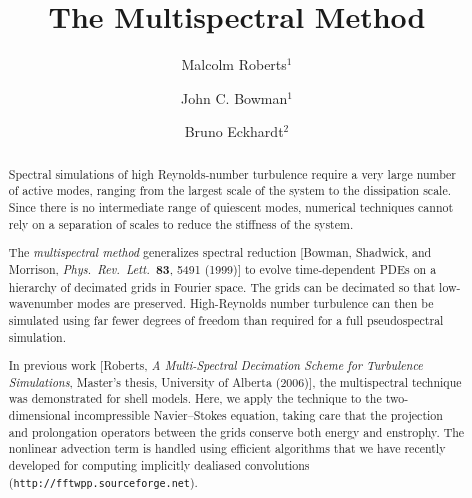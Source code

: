 \documentclass{amsart}
\title{The Multispectral Method}
\author{Malcolm Roberts$^1$
\and
John C. Bowman$^1$
\and
Bruno Eckhardt$^2$
}
\date{}
\begin{document}
\begin{abstract}

Spectral simulations of high Reynolds-number turbulence require a very
large number of active modes, ranging from the largest scale of the
system to the dissipation scale. Since there is no intermediate range
of quiescent modes, numerical techniques cannot rely on a separation
of scales to reduce the stiffness of the system. 

The \emph{multispectral method} generalizes spectral reduction 
[Bowman, Shadwick, and Morrison,  \emph{Phys.\ Rev.\ Lett.\ }{\bf 83}, 
5491 (1999)] to evolve time-dependent PDEs on a hierarchy of decimated
grids in Fourier space.  The grids can be decimated so that low-wavenumber
modes are preserved. High-Reynolds number turbulence can then be simulated
using far fewer degrees of freedom than required for a full pseudospectral
simulation.

In previous work [Roberts, \emph{A Multi-Spectral Decimation Scheme for
  Turbulence Simulations}, Master's thesis, University of Alberta (2006)],
the multispectral technique was demonstrated for shell models. 
Here, we apply the technique to the two-dimensional incompressible
Navier--Stokes equation, taking care that the projection and prolongation
operators between the grids conserve both energy and enstrophy. 
The nonlinear advection term is handled using efficient algorithms 
that we have recently developed for computing implicitly dealiased
convolutions ({\tt http://fftwpp.sourceforge.net}).

\end{abstract}

\maketitle
\end{document}
